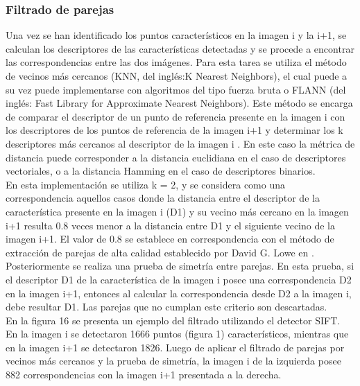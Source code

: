 \subsubsection{Filtrado de parejas}


Una vez se han identificado los puntos característicos en la imagen i y la i+1, se calculan los descriptores de las características detectadas y se procede a encontrar las correspondencias entre las dos imágenes. Para esta tarea se utiliza el método de vecinos más cercanos (KNN, del inglés:K Nearest Neighbors), el cual puede a su vez puede implementarse con algoritmos del tipo fuerza bruta o FLANN (del inglés: Fast Library for Approximate Nearest Neighbors). Este método se encarga de comparar el descriptor de un punto de referencia presente en la imagen i con los descriptores de los puntos de referencia de la imagen i+1 y determinar los k descriptores más cercanos al descriptor de la imagen i . En este caso la métrica de distancia puede corresponder a la distancia euclidiana en el caso de descriptores vectoriales, o a la distancia Hamming en el caso de descriptores binarios.\\

En esta implementación se utiliza k = 2, y se considera como una correspondencia aquellos casos donde la distancia entre el descriptor de la característica presente en la imagen i (D1) y su vecino más cercano en la imagen i+1 resulta 0.8 veces menor a la distancia entre D1 y el siguiente vecino de la imagen i+1. El valor de 0.8 se establece en correspondencia con el método de extracción de parejas de alta calidad establecido por David G. Lowe en \cite{Lowe}.\\

Posteriormente se realiza una prueba de simetría entre parejas. En esta prueba, si el descriptor D1 de la característica  de la imagen i posee una correspondencia D2 en la imagen i+1, entonces al calcular la correspondencia desde D2 a la imagen i, debe resultar D1. Las parejas que no cumplan este criterio son descartadas.\\

En la figura 16 se presenta un ejemplo del filtrado  utilizando el detector SIFT. En la imagen i se detectaron 1666 puntos (figura 1) característicos, mientras que en la imagen i+1 se detectaron 1826. Luego de aplicar el filtrado de parejas por vecinos más cercanos y la prueba de simetría, la imagen i de la izquierda posee 882 correspondencias con la imagen i+1 presentada a la derecha.\\

